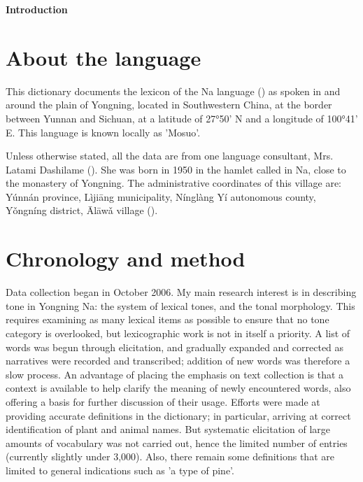 	{\LARGE \textbf{Introduction}}
	\section{About the language} \label{sec:language}

This dictionary documents the lexicon of the Na language () as spoken in and around the plain of Yongning, located in Southwestern China, at the border between Yunnan and Sichuan, at a latitude of 27°50’ N and a longitude of 100°41’ E. This language is known locally as 'Mosuo'. 

Unless otherwise stated, all the data are from one language consultant, Mrs. Latami Dashilame (). She was born in 1950 in the hamlet called  in Na, close to the monastery of Yongning. The administrative coordinates of this village are: Yúnnán province, Lìjiāng municipality, Nínglàng Yí autonomous county, Yǒngníng district, Ālāwǎ village (). 

	\section{Chronology and method} \label{sec:method}

Data collection began in October 2006. My main research interest is in describing tone in Yongning Na: the system of lexical tones, and the tonal morphology. This requires examining as many lexical items as possible to ensure that no tone category is overlooked, but lexicographic work is not in itself a priority. A list of words was begun through elicitation, and gradually expanded and corrected as narratives were recorded and transcribed; addition of new words was therefore a slow process. An advantage of placing the emphasis on text collection is that a context is available to help clarify the meaning of newly encountered words, also offering a basis for further discussion of their usage. Efforts were made at providing accurate definitions in the dictionary; in particular, arriving at correct identification of plant and animal names. But systematic elicitation of large amounts of vocabulary was not carried out, hence the limited number of entries (currently slightly under 3,000). Also, there remain some definitions that are limited to general indications such as 'a type of pine'. 

